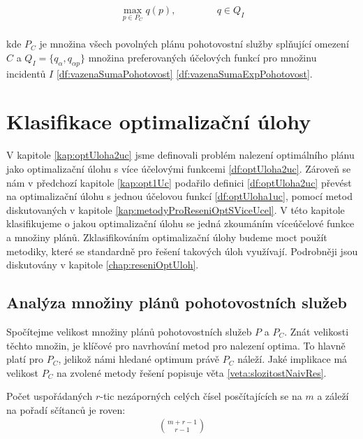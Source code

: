 \begin{definice}\label{df:optUloha1uc}
  \begin{align*}
    \max_{p \in P_C} q(p), \hspace{50pt} q \in Q_I
  \end{align*}
  \\
  kde $P_C$ je množina všech povolných plánu pohotovostní služby splňující omezení $C$
  a $Q_I = \{ q_{\alpha}, q_{\alpha p}\}$ množina preferovaných účelových funkcí pro množinu incidentů $I$ \ref{df:vazenaSumaPohotovost} \ref{df:vazenaSumaExpPohotovost}.
\end{definice}

\section{Klasifikace optimalizační úlohy}

V kapitole \ref{kap:optUloha2uc} jsme definovali problém nalezení optimálního plánu jako optimalizační úlohu s více účelovými funkcemi \ref{df:optUloha2uc}.
Zároveň se nám v předchozí kapitole \ref{kap:opt1Uc} podařilo definici \ref{df:optUloha2uc} převést na optimalizační úlohu s jednou účelovou funkcí \ref{df:optUloha1uc},
pomocí metod diskutovaných v kapitole \ref{kap:metodyProReseniOptSViceUcel}.
V této kapitole klasifikujeme o jakou optimalizační úlohu se jedná zkoumáním víceúčelové funkce a množiny plánů.
Zklasifikováním optimalizační úlohy budeme moct použít metodiky, které se standardně pro řešení takových úloh využívají. 
Podrobněji jsou diskutovány v kapitole \ref{chap:reseniOptUloh}.

\subsection{Analýza množiny plánů pohotovostních služeb}\label{kap:analP}

Spočítejme velikost množiny plánů pohotovostních služeb $P$ a $P_C$.
Znát velikosti těchto množin, je klíčové pro navrhování metod pro nalezení optima.
To hlavně platí pro $P_C$, jelikož námi hledané optimum právě $P_C$ náleží.
Jaké implikace má velikost $P_C$ na zvolené metody řešení popisuje věta \ref{veta:slozitostNaivRes}.

\begin{lemma}\label{lemma:pocetRtic}
  Počet uspořádaných $r$-tic nezáporných celých čísel posčítajících se na $m$ a záleží na pořadí sčítanců je roven: 
  \begin{align*}
    \binom{m + r - 1}{r - 1}
  \end{align*}
  \\
\end{lemma}

